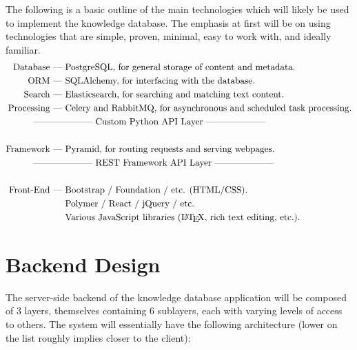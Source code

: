 \documentclass[12pt,letterpaper]{article}
\begin{document}
The following is a basic outline of the main technologies which will likely be used to implement the knowledge database. The emphasis at first will be on using technologies that are simple, proven, minimal, easy to work with, and ideally familiar.
\begin{align*}
\textrm{Database --- }& \textrm{PostgreSQL, for general storage of content and metadata.} \\
\textrm{ORM --- }& \textrm{SQLAlchemy, for interfacing with the database.} \\
\textrm{Search --- }& \textrm{Elasticsearch, for searching and matching text content.} \\ 
\textrm{Processing --- }& \textrm{Celery and RabbitMQ, for asynchronous and scheduled task processing.} \\ 
\textrm{-----------}& \textrm{--------- Custom Python API Layer --------------------} \\ \\
\textrm{Framework --- }& \textrm{Pyramid, for routing requests and serving webpages.} \\
\textrm{-----------}& \textrm{--------- REST Framework API Layer --------------------} \\ \\
\textrm{Front-End --- }& \textrm{Bootstrap / Foundation / etc. (HTML/CSS).} \\
& \textrm{Polymer / React / jQuery / etc.} \\
& \textrm{Various JavaScript libraries (\LaTeX, rich text editing, etc.).}
\end{align*}




\section{Backend Design}

The server-side backend of the knowledge database application will be composed of 3 layers, themselves containing 6 sublayers, each with varying levels of access to others. The system will essentially have the following architecture (lower on the list roughly implies closer to the client):
\end{document}

